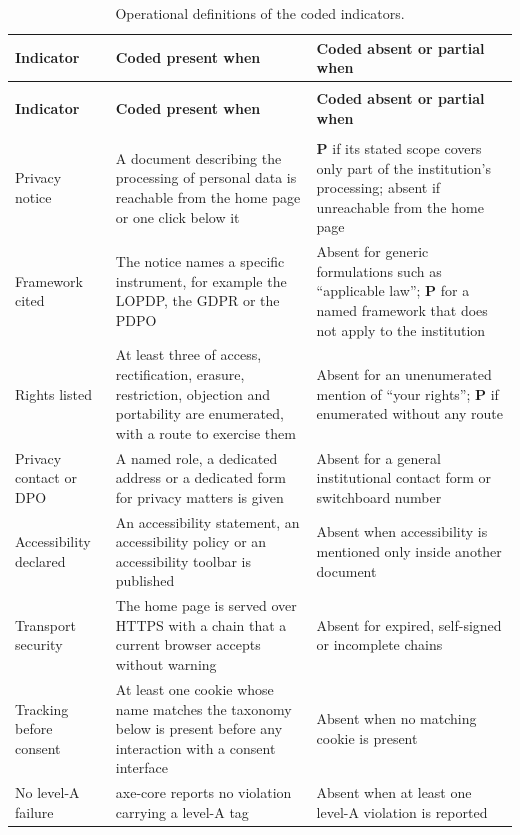 \documentclass[pdflatex,sn-basic,Numbered]{sn-jnl}
\theoremstyle{thmstyleone}
\theoremstyle{thmstyletwo}
\theoremstyle{thmstylethree}
\begin{document}
\begin{appendices}
\footnotesize
\begin{longtable}{@{}>{\RaggedRight}p{2.7cm}>{\RaggedRight}p{4.75cm}>{\RaggedRight\arraybackslash}p{4.55cm}@{}}
	\caption{Operational definitions of the coded indicators.}\label{tab:codebook}\\
	\toprule
	\textbf{Indicator} & \textbf{Coded present when} & \textbf{Coded absent or partial when} \\
	\midrule
	\endfirsthead
	\multicolumn{3}{c}{\textit{(Table~\ref{tab:codebook}, continued)}}\\
	\toprule
	\textbf{Indicator} & \textbf{Coded present when} & \textbf{Coded absent or partial when} \\
	\midrule
	\endhead
	\midrule
	\multicolumn{3}{r}{\textit{Continued on next page}}\\
	\endfoot
	\bottomrule
	\endlastfoot
	Privacy notice & A document describing the processing of personal data is reachable from the home page or one click below it & \textbf{P} if its stated scope covers only part of the institution's processing; absent if unreachable from the home page \\
	\addlinespace
	Framework cited & The notice names a specific instrument, for example the LOPDP, the GDPR or the PDPO & Absent for generic formulations such as ``applicable law''; \textbf{P} for a named framework that does not apply to the institution \\
	\addlinespace
	Rights listed & At least three of access, rectification, erasure, restriction, objection and portability are enumerated, with a route to exercise them & Absent for an unenumerated mention of ``your rights''; \textbf{P} if enumerated without any route \\
	\addlinespace
	Privacy contact or DPO & A named role, a dedicated address or a dedicated form for privacy matters is given & Absent for a general institutional contact form or switchboard number \\
	\addlinespace
	Accessibility declared & An accessibility statement, an accessibility policy or an accessibility toolbar is published & Absent when accessibility is mentioned only inside another document \\
	\addlinespace
	Transport security & The home page is served over HTTPS with a chain that a current browser accepts without warning & Absent for expired, self-signed or incomplete chains \\
	\addlinespace
	Tracking before consent & At least one cookie whose name matches the taxonomy below is present before any interaction with a consent interface & Absent when no matching cookie is present \\
	\addlinespace
	No level-A failure & axe-core reports no violation carrying a level-A tag & Absent when at least one level-A violation is reported \\
\end{longtable}
\normalsize


\end{appendices}
\end{document}

